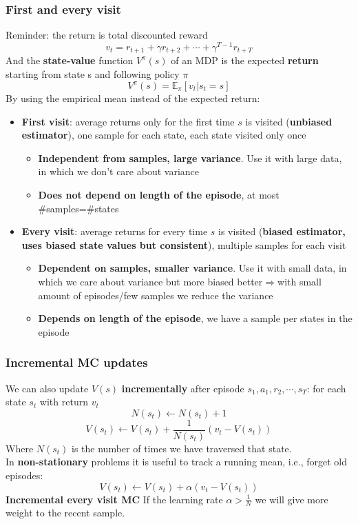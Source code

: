 \subsubsection{First and every visit}
    Reminder: the return is total discounted reward
    $$v_t=r_{t+1}+\gamma r_{t+2}+\cdots+\gamma^{T-1}r_{t+T}$$
    And the \textbf{state-value} function $V^{\pi}(s)$ of an MDP is the expected \textbf{return} starting from state s and following policy $\pi$
    $$V^{\pi}(s)=\mathbb{E}_{\pi}[v_t|s_t=s]$$
    By using the empirical mean instead of the expected return:
    \begin{itemize}
        \item \textbf{First visit}: average returns only for the first time $s$ is visited (\textbf{unbiased estimator}), one sample for each state, each state visited only once
        \begin{itemize}
            \item \textbf{Independent from samples, large variance}. Use it with large data, in which we don't care about variance
            \item \textbf{Does not depend on length of the episode}, at most \#samples=\#states
        \end{itemize}
        \item \textbf{Every visit}: average returns for every time $s$ is visited (\textbf{biased estimator, uses biased state values but consistent}), multiple samples for each visit
        \begin{itemize}
            \item \textbf{Dependent on samples, smaller variance}. Use it with small data, in which we care about variance but more biased better$\Rightarrow$with small amount of episodes/few samples we reduce the variance
            \item \textbf{Depends on length of the episode}, we have a sample per states in the episode
        \end{itemize}
    \end{itemize}
\subsubsection{Incremental MC updates}
    We can also update $V(s)$ \textbf{incrementally} after episode $s_1,a_1,r_2,\cdots,s_T$: for each state $s_t$ with return $v_t$
    $$N(s_t)\leftarrow N(s_t)+1$$
    $$V(s_t)\leftarrow V(s_t)+\frac{1}{N(s_t)}(v_t-V(s_t))$$
    Where $N(s_t)$ is the number of times we have traversed that state.\\
    In \textbf{non-stationary} problems it is useful to track a running mean, i.e., forget old episodes:
    $$V(s_t)\leftarrow V(s_t)+\alpha (v_t-V(s_t))$$
    \textbf{Incremental every visit MC}
    If the learning rate $\alpha > \frac{1}{N}$ we will give more weight to the recent sample.


